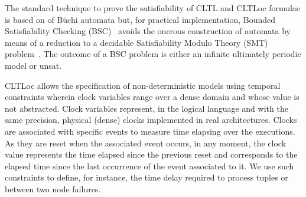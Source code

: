 \documentclass[smallextended]{svjour3}       %
\begin{document}
The standard technique to prove the satisfiability of CLTL and CLTLoc formulae is based on of B\"uchi automata \cite{DD07,BRS15} %
but, for practical implementation, Bounded Satisfiability Checking (BSC)~\cite{MPS13} avoids the onerous construction of automata by means of a reduction to a decidable Satisfiability Modulo Theory (SMT) problem~\cite{BRS15}.
The outcome of a BSC problem is either an infinite ultimately periodic model or unsat.

CLTLoc allows the specification of non-deterministic models using temporal constraints wherein clock variables range over a dense domain and whose value is not abstracted.
Clock variables represent, in the logical language and with the same precision, physical (dense) clocks implemented in real architectures.
Clocks are associated with specific events to measure time elapsing over the executions.
As they are reset when the associated event occurs, in any moment, the clock value represents the time elapsed since the previous reset and corresponds to the elapsed time since the last occurrence of the event associated to it.
We use such constraints to define, for instance, the time delay required to process tuples or between two node failures.\\


%

%
\end{document}
